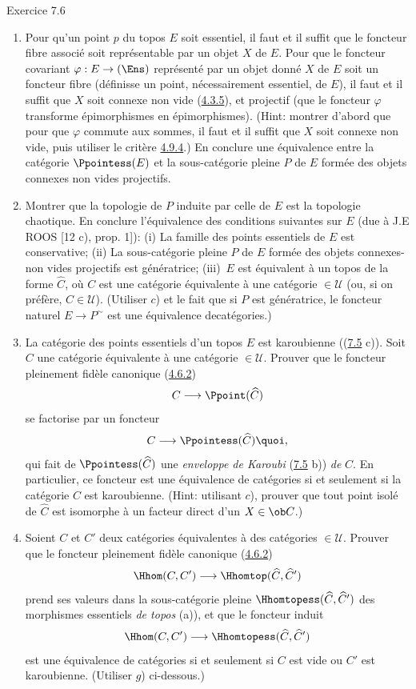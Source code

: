 \begin{enonce*}[remark]{Exercice 7.6}
\begin{enumerate}
\item Pour qu'un point $p$ du topos $E$ soit essentiel, il faut et il
suffit que le foncteur fibre associé soit représentable par un objet
$X$ de $E$. Pour que le foncteur covariant $\varphi:E\rightarrow
(\Ens)$ représenté par un objet donné $X$ de $E$ soit un foncteur
fibre (\ie définisse un point, nécessairement essentiel, de $E$), il
faut et il suffit que $X$ soit connexe non vide
(\hyperref[IV.subsubsec4.3.5]{4.3.5}), et projectif (\ie que le foncteur
$\varphi$ transforme épimorphismes en épimorphismes). (Hint: montrer
d'abord que pour que $\varphi$ commute aux sommes, il faut et il
suffit que $X$ soit connexe non vide, puis utiliser le critère
\hyperref[IV.prop4.9.4]{4.9.4}.) En conclure une équivalence entre la catégorie
$\Ppointess(E)$ et la sous-catégorie pleine $P$ de $E$ formée des
objets connexes non vides projectifs.

\item Montrer que la topologie de $P$ induite par celle de $E$ est la
topologie chaotique. En conclure l'équivalence des conditions
suivantes sur $E$ (due à J.E ROOS [12 c), prop. 1]): (i) La famille
des points essentiels de $E$ est conservative; (ii) La
sous-catégorie pleine $P$ de $E$ formée des objets connexes-non
vides projectifs est génératrice; (iii)~$E$ est équivalent à un
topos de la forme $\widehat{C}$, où $C$ est une catégorie
équivalente à une catégorie $\in 𝒰$ (ou, si on préfère,
$C\in 𝒰$). (Utiliser $c$) et le fait que si $P$ est
génératrice, le foncteur naturel $E\rightarrow P^{\sim}$ est une
équivalence de\pageoriginale catégories.)

\item La catégorie des points essentiels d'un topos $E$ est
karoubienne (\cf (\hyperref[IV.exer7.5]{7.5} c)). Soit $C$ une catégorie
équivalente à une catégorie $\in 𝒰$. Prouver que le foncteur
pleinement fidèle canonique (\hyperref[IV.subsubsec4.6.2]{4.6.2})
$$
C\longrightarrow \Ppoint(\widehat{C})
$$
se factorise par un foncteur
$$
C\longrightarrow \Ppointess(\widehat{C}){\quoi},
$$
qui fait de $\Ppointess(\widehat{C})$ une \emph{enveloppe de
Karoubi} (\hyperref[IV.exer7.5]{7.5} b)) \emph{de} $C$. En particulier, ce
foncteur est une équivalence de catégories si et seulement si la
catégorie $C$ est karoubienne. (Hint: utilisant $c$), prouver que
tout point isolé de $\widehat{C}$ est isomorphe à un facteur direct
d'un $X\in \ob C$.)

\item Soient $C$ et $C'$ deux catégories équivalentes à des catégories
$\in 𝒰$. Prouver que le foncteur pleinement fidèle canonique
(\hyperref[IV.subsubsec4.6.2]{4.6.2})
$$
\Hhom(C,C')\longrightarrow \Hhomtop(\widehat{C},\widehat{C}')
$$
prend ses valeurs dans la sous-catégorie pleine
$\Hhomtopess(\widehat{C},\widehat{C}')$ des morphismes essentiels
\emph{de topos} (a)), et que le foncteur induit
$$
\Hhom(C,C')\longrightarrow \Hhomtopess(\widehat{C},\widehat{C}')
$$
est une équivalence de catégories si et seulement si $C$ est vide ou
$C'$ est karoubienne. (Utiliser $g$) ci-dessous.)


\end{enumerate}
\end{enonce*}
